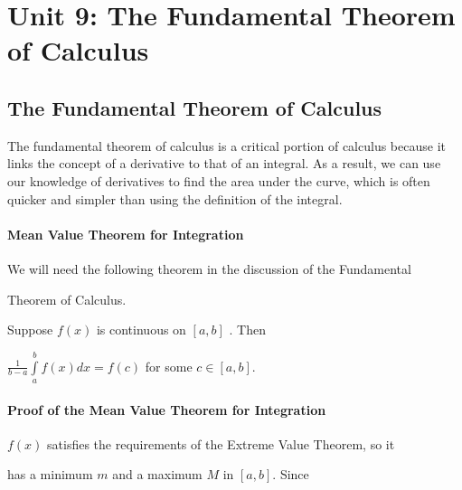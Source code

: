 \chapter{Unit 9: The Fundamental Theorem of Calculus}
\label{chap:unit9}

\section{The Fundamental Theorem of Calculus}
\label{sec:thef-1211}

The fundamental theorem of calculus is a critical portion of calculus because it links the concept of a derivative to that of an integral. As a result, we can use our knowledge of derivatives to find the area under the curve, which is often quicker and simpler than using the definition of the integral.


\subsubsection{Mean Value Theorem for Integration}
\label{sss:mean-b942}


We will need the following theorem in the discussion of the Fundamental

Theorem of Calculus.


Suppose $f(x)$ is continuous on $[a,b]$ . Then

$\frac{1}{b-a}\int\limits_a^b f(x)dx=f(c)$ for some $c\in[a,b]$.


\subsubsection{Proof of the Mean Value Theorem for Integration}
\label{sss:proo-439f}


$f(x)$ satisfies the requirements of the Extreme Value Theorem, so it

has a minimum $m$ and a maximum $M$ in $[a,b]$. Since


